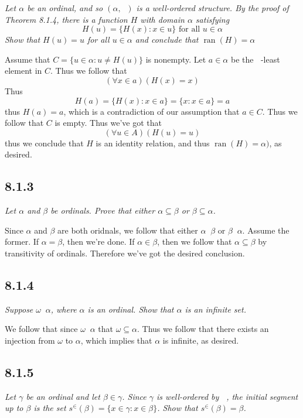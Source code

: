\documentclass[11pt,oneside,titlepage]{book}
\DeclareMathOperator \ran {ran}
\DeclareMathOperator \ineq {\underline{\in}}
\newcommand{\set}[1]{\{ #1 \}}
\begin{document}
\textit{Let $\alpha$ be an ordinal, and so $(\alpha, \ineq)$ is a well-ordered structure.
  By the proof of Theorem 8.1.4, there is a function $H$ with domain $\alpha$
  satisfying 
  $$H(u) = \set{H(x): x \in u} \text{ for all } u \in \alpha$$
  Show that $H(u) = u$ for all $u \in \alpha$ and conclude that $\ran(H) = \alpha$}

Assume that $C = \set{u \in \alpha: u \neq H(u)}$ is nonempty. Let $a \in \alpha$ be the
$\ineq$-least element in $C$. Thus we follow that
$$(\forall x \in a)(H(x) = x)$$
Thus
$$H(a) = \set{H(x): x \in a} = \set{x: x \in a} = a$$
thus $H(a) = a$, which is a contradiction of our assumption that $a \in C$. Thus we follow that
$C$ is empty. Thus we've got that
$$(\forall u \in A)(H(u) = u)$$
thus we conclude that $H$ is an identity relation, and thus $\ran(H) = \alpha)$, as desired.

\subsection*{8.1.3}

\textit{Let $\alpha$ and $\beta$ be ordinals. Prove that either $\alpha \subseteq \beta$ or
  $\beta \subseteq \alpha$.}

Since $\alpha$ and $\beta$ are both oridnals, we follow that either $\alpha \ineq \beta$
or $\beta \ineq \alpha$. Assume the former. If $\alpha = \beta$, then we're done.
If $\alpha \in \beta$, then we follow that $\alpha \subseteq \beta$ by transitivity of
ordinals. Therefore we've got the desired conclusion.

\subsection*{8.1.4}

\textit{Suppose $\omega \ineq \alpha$, where $\alpha$ is an ordinal. Show that $\alpha$
  is an infinite set.}

We follow that since $\omega \ineq \alpha$ that $\omega \subseteq \alpha$. Thus we follow
that there exists an injection from $\omega$ to $\alpha$, which implies that $\alpha$ is
infinite, as desired.

\subsection*{8.1.5}

\textit{Let $\gamma$ be an ordinal and let $\beta \in \gamma$. Since $\gamma$ is well-ordered
  by $\ineq$, the initial segment up to $\beta$ is the set
  $s^\in(\beta) = \set{x \in \gamma: x \in \beta}$. Show that $s^\in(\beta) = \beta$.}
\end{document}
